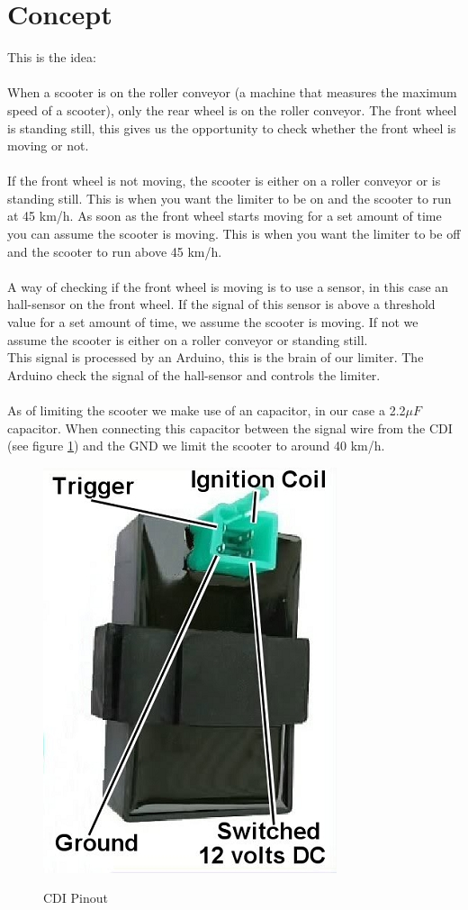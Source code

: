 \documentclass[a4paper]{article}
\begin{document}
\section{Concept}
This is the idea: 
\\ \\
When a scooter is on the roller conveyor (a machine that measures the maximum speed of a scooter), only the rear wheel is on the roller conveyor.
The front wheel is standing still, this gives us the opportunity to check whether the front wheel is moving or not.
\\ \\
If the front wheel is not moving, the scooter is either on a roller conveyor or is standing still.
This is when you want the limiter to be on and the scooter to run at 45 km/h.
As soon as the front wheel starts moving for a set amount of time you can assume the scooter is moving.
This is when you want the limiter to be off and the scooter to run above 45 km/h.
\\ \\
A way of checking if the front wheel is moving is to use a sensor, in this case an hall-sensor on the front wheel.
If the signal of this sensor is above a threshold value for a set amount of time, we assume the scooter is moving.
If not we assume the scooter is either on a roller conveyor or standing still.
\\ 
This signal is processed by an Arduino, this is the brain of our limiter.
The Arduino check the signal of the hall-sensor and controls the limiter.
\\ \\ 
As of limiting the scooter we make use of an capacitor, in our case a 2.2$\mu F$ capacitor.
When connecting this capacitor between the signal wire from the CDI (see figure \ref{fig:cdi_pinout}) and the GND we limit the scooter to around 40 km/h.
\begin{figure}[h]
    \caption{CDI Pinout}
    \centering
    \includegraphics[scale=0.3]{CDI-Pinout.jpg}
    \label{fig:cdi_pinout}
\end{figure}
\end{document}
